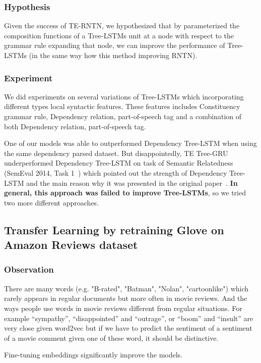 \subsubsection{Hypothesis}
Given the success of TE-RNTN, we hypothesized that by parameterized the composition functions of a Tree-LSTMs unit at a node with respect to the grammar rule expanding that node, we can improve the performance of Tree-LSTMs (in the same way how this method improving RNTN).

\subsubsection{Experiment}
We did experiments on several variations of Tree-LSTMs which incorporating different types local syntactic features.
These features includes Constituency grammar rule, Dependency relation, part-of-speech tag and a combination of both Dependency relation, part-of-speech tag.

One of our models was able to outperformed Dependency Tree-LSTM when using the same dependency parsed dataset. 
But disappointedly, TE Tree-GRU underperformed Dependency Tree-LSTM on task of Semantic Relatedness (SemEval 2014, Task 1~\cite{SemeEvalTask1}) which pointed out the strength of Dependency Tree-LSTM and the main reason why it was presented in the original paper~\cite{treeLSTM}.
\textbf{In general, this approach was failed to improve Tree-LSTMs}, so we tried two more different approaches.

\subsection{Transfer Learning by retraining Glove on Amazon Reviews dataset}

\subsubsection{Observation}
There are many words (e.g. "B-rated", "Batman", "Nolan", "cartoonlike") which rarely appears in regular documents but more often in movie reviews.
And the ways people use words in movie reviews different from regular situations.
For example “sympathy”, “disappointed” and “outrage”, or “boom” and “insult” are very close given word2vec but if we have to predict the sentiment of a sentiment of a movie comment given one of these word, it should be distinctive.

Fine-tuning embeddings significantly improve the models.

